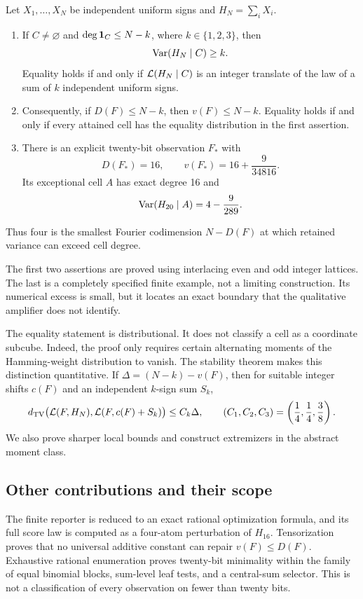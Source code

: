 \begin{theorem}
\label{thm:headline}
Let \(X_1,\ldots,X_N\) be independent uniform signs and
\(H_N=\sum_iX_i\).
\begin{enumerate}
\item If \(C\ne\varnothing\) and
\(\deg\mathbf 1_C\le N-k\), where \(k\in\{1,2,3\}\), then
\[
 \operatorname{Var}(H_N\mid C)\ge k.
\]
Equality holds if and only if \(\mathcal L(H_N\mid C)\) is an integer translate
of the law of a sum of \(k\) independent uniform signs.
\item Consequently, if \(D(F)\le N-k\), then \(v(F)\le N-k\).
Equality holds if and only if every attained cell has the equality
distribution in the first assertion.
\item There is an explicit twenty-bit observation \(F_*\) with
\[
 D(F_*)=16,\qquad
 v(F_*)=16+\frac9{34816}.
\]
Its exceptional cell \(A\) has exact degree 16 and
\[
 \operatorname{Var}(H_{20}\mid A)=4-\frac9{289}.
\]
\end{enumerate}
Thus four is the smallest Fourier codimension \(N-D(F)\) at which
retained variance can exceed cell degree.
\end{theorem}

The first two assertions are proved using interlacing even and odd
integer lattices. The last is a completely specified finite example,
not a limiting construction. Its numerical excess is small, but it
locates an exact boundary that the qualitative amplifier does not
identify.

The equality statement is distributional. It does not classify a cell
as a coordinate subcube. Indeed, the proof only requires certain
alternating moments of the Hamming-weight distribution to vanish.
The stability theorem makes this distinction quantitative. If
\(\Delta=(N-k)-v(F)\), then for suitable integer shifts \(c(F)\) and an
independent \(k\)-sign sum \(S_k\),
\begin{equation}\label{eq:headline-stability}
 d_{\mathrm{TV}}\bigl(\mathcal L(F,H_N),\mathcal L(F,c(F)+S_k)\bigr)
 \le C_k\Delta,\qquad
 (C_1,C_2,C_3)=\left(\frac14,\frac14,\frac38\right).
\end{equation}
We also prove sharper local bounds and construct extremizers in the
abstract moment class.

\subsection{Other contributions and their scope}

The finite reporter is reduced to an exact rational optimization
formula, and its full score law is computed as a four-atom perturbation
of \(H_{16}\). Tensorization proves that no universal additive constant
can repair \(v(F)\le D(F)\). Exhaustive rational enumeration proves
twenty-bit minimality within the family of equal binomial blocks,
sum-level leaf tests, and a central-sum selector. This is not a
classification of every observation on fewer than twenty bits.

